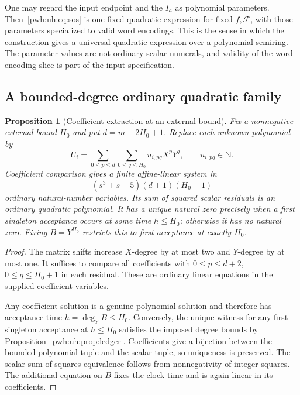 \documentclass[11pt,letterpaper]{article}
\numberwithin{equation}{section}
\newtheorem{proposition}[theorem]{Proposition}
\theoremstyle{definition}
\newcommand{\N}{\mathbb N}
\newcommand{\F}{\mathcal F}
\begin{document}
One may regard the input endpoint and the $I_a$ as polynomial parameters.
Then~\eqref{pwh:uh:eq:sos} is one fixed quadratic expression for fixed $f,\F$,
with those parameters specialized to valid word encodings. This is the
sense in which the construction gives a universal quadratic expression
over a polynomial semiring. The parameter values are not ordinary scalar
numerals, and validity of the word-encoding slice is part of the input
specification.

\subsection{A bounded-degree ordinary quadratic family}

\begin{proposition}[Coefficient extraction at an external bound]
\label{pwh:uh:prop:bounded}
Fix a nonnegative external bound $H_0$ and put $d=m+2H_0+1$. Replace each
unknown polynomial by
\[
 U_i=\sum_{0\le p\le d}\sum_{0\le q\le H_0}u_{i,pq}X^pY^q,
 \qquad u_{i,pq}\in\N.
\]
Coefficient comparison gives a finite affine-linear system in
\begin{equation}
 (s^3+s+5)(d+1)(H_0+1)
 \label{pwh:uh:eq:scalararity}
\end{equation}
ordinary natural-number variables. Its sum of squared scalar residuals is
an ordinary quadratic polynomial. It has a unique natural zero precisely
when a first singleton acceptance occurs at some time $h\le H_0$; otherwise
it has no natural zero. Fixing $B=Y^{H_0}$ restricts this to first acceptance
at exactly $H_0$.
\end{proposition}

\begin{proof}
The matrix shifts increase $X$-degree by at most two and $Y$-degree by at
most one. It suffices to compare all coefficients with
$0\le p\le d+2$, $0\le q\le H_0+1$ in each residual. These are ordinary
linear equations in the supplied coefficient variables.

Any coefficient solution is a genuine polynomial solution and therefore
has acceptance time $h=\deg_Y B\le H_0$. Conversely, the unique witness
for any first singleton acceptance at $h\le H_0$ satisfies the imposed
degree bounds by Proposition~\ref{pwh:uh:prop:ledger}. Coefficients give a
bijection between the bounded polynomial tuple and the scalar tuple, so
uniqueness is preserved. The scalar sum-of-squares equivalence follows
from nonnegativity of integer squares. The additional equation on $B$
fixes the clock time and is again linear in its coefficients.
\end{proof}
\end{document}
